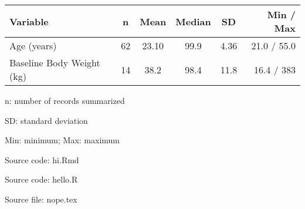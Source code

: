 \setlength{\tabcolsep}{5pt}
\begin{threeparttable}
\renewcommand{\arraystretch}{1.3}
\begin{tabular}[h]{lccccr}
\hline
Variable & n & Mean & Median & SD & Min / Max \\
\hline
Age (years) & 62 & 23.10 & 99.9 & 4.36 & 21.0 / 55.0 \\
Baseline Body Weight (kg) & 14 & 38.2 & 98.4 & 11.8 & 16.4 / 383 \\
\hline
\end{tabular}
\begin{tablenotes}[flushleft]
\item n: number of records summarized
\item SD: standard deviation
\item Min: minimum; Max: maximum
\item Source code: hi.Rmd
\item Source code: hello.R
\item Source file: nope.tex
\end{tablenotes}
\end{threeparttable}